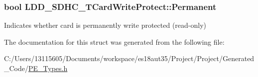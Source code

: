 \subsubsection[{Permanent}]{\setlength{\rightskip}{0pt plus 5cm}bool L\+D\+D\+\_\+\+S\+D\+H\+C\+\_\+\+T\+Card\+Write\+Protect\+::\+Permanent}\label{struct_l_d_d___s_d_h_c___t_card_write_protect_aff6b0178087c770234bd68974d643552}
Indicates whether card is permanently write protected (read-\/only) 

The documentation for this struct was generated from the following file\+:\begin{DoxyCompactItemize}
\item 
C\+:/\+Users/13115605/\+Documents/workspace/es18aut35/\+Project/\+Project/\+Generated\+\_\+\+Code/\hyperlink{_p_e___types_8h}{P\+E\+\_\+\+Types.\+h}\end{DoxyCompactItemize}
